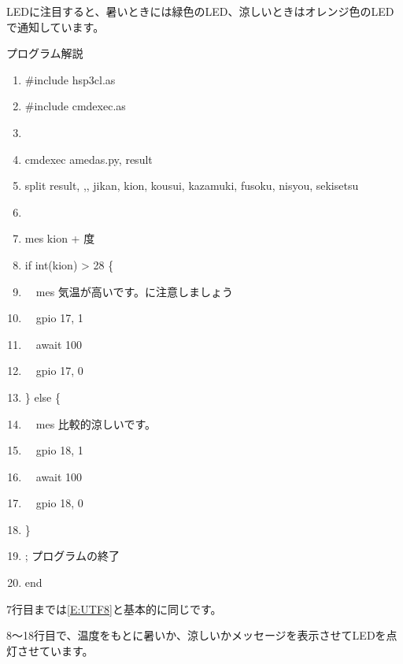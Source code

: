 \documentclass[a4paper,12pt,dvipdfmx]{jarticle}
\begin{document}
LEDに注目すると、暑いときには緑色のLED、涼しいときはオレンジ色のLEDで通知しています。


\bigskip


\bigskip

\clearpage
プログラム解説



\begin{center}
\begin{boxedminipage}{15.272cm}
\begin{enumerate}
\setlength{\itemsep}{0cm} %
\item \#include {\textquotedbl}hsp3cl.as{\textquotedbl}
\item \#include {\textquotedbl}cmdexec.as{\textquotedbl}
\item
\item cmdexec {\textquotedbl}amedas.py{\textquotedbl}, result
\item split result, {\textquotedbl},{\textquotedbl}, jikan, kion, kousui, kazamuki, fusoku, nisyou, sekisetsu
\item
\item mes kion + {\textquotedbl}度{\textquotedbl}
\item if int(kion) {\textgreater} 28 \{
\item \ \ mes
{\textquotedbl}気温が高いです。に注意しましょう{\textquotedbl}
\item \ \ gpio 17, 1
\item \ \ await 100
\item \ \ gpio 17, 0
\item \} else \{
\item \ \ mes {\textquotedbl}比較的涼しいです。{\textquotedbl}
\item \ \ gpio 18, 1
\item \ \ await 100
\item \ \ gpio 18, 0
\item \}
\item ; プログラムの終了
\item end
\end{enumerate}
\end{boxedminipage}
\end{center}

\bigskip



\bigskip

7行目までは\ref*{E:UTF8}と基本的に同じです。

8〜18行目で、温度をもとに暑いか、涼しいかメッセージを表示させてLEDを点灯させています。
\end{document}
